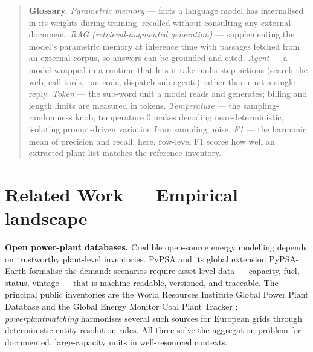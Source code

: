 \documentclass[a4paper,11pt]{article}
\begin{document}
\begin{quote}
\textbf{Glossary.} \emph{Parametric memory} --- facts a language model
has internalised in its weights during training, recalled without
consulting any external document. \emph{RAG (retrieval-augmented
generation)} --- supplementing the model's parametric memory at
inference time with passages fetched from an external corpus, so answers
can be grounded and cited. \emph{Agent} --- a model wrapped in a runtime
that lets it take multi-step actions (search the web, call tools, run
code, dispatch sub-agents) rather than emit a single reply. \emph{Token}
--- the sub-word unit a model reads and generates; billing and length
limits are measured in tokens. \emph{Temperature} --- the
sampling-randomness knob; temperature 0 makes decoding
near-deterministic, isolating prompt-driven variation from sampling
noise. \emph{F1} --- the harmonic mean of precision and recall; here,
row-level F1 scores how well an extracted plant list matches the
reference inventory.
\end{quote}

\section{Related Work --- Empirical
landscape}\label{sec:related-empirical}

\textbf{Open power-plant databases.} Credible open-source energy
modelling depends on trustworthy plant-level inventories. PyPSA
\citep{Brown-Tom2018:pypsa} and its global extension PyPSA-Earth
\citep{Parzen-Maximilian2023:pypsa-earth} formalise the demand:
scenarios require asset-level data --- capacity, fuel, status, vintage
--- that is machine-readable, versioned, and traceable. The principal
public inventories are the World Resources Institute Global Power Plant
Database \citep{Byers-Logan2018:wri-gppd} and the Global Energy Monitor
Coal Plant Tracker \citep{GEM2026:gcpt}; \emph{powerplantmatching}
\citep{Gotzens-Fabian2019:powerplantmatching} harmonises several such
sources for European grids through deterministic entity-resolution
rules. All three solve the aggregation problem for documented,
large-capacity units in well-resourced contexts.
\end{document}
